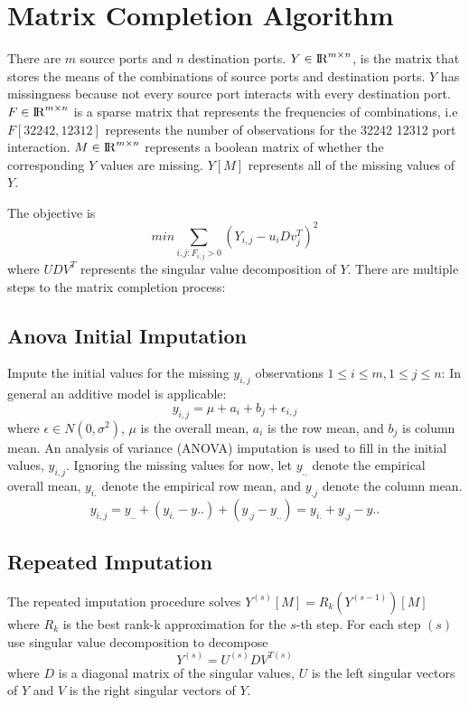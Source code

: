 \documentclass[12pt,twoside]{dukestatscithesis}
\theoremstyle{definition}
\theoremstyle{definition}
\theoremstyle{definition}
\theoremstyle{remark}
\begin{document}
\section{Matrix Completion Algorithm}\label{matrix-completion-algorithm}

There are \(m\) source ports and \(n\) destination ports.
\(Y \in {\rm I\!R}^{m \times n}\), is the matrix that stores the means
of the combinations of source ports and destination ports. \(Y\) has
missingness because not every source port interacts with every
destination port. \(F \in {\rm I\!R}^{m \times n}\) is a sparse matrix
that represents the frequencies of combinations, i.e \(F[32242,12312]\)
represents the number of observations for the 32242 12312 port
interaction. \(M \in {\rm I\!R}^{m \times n}\) represents a boolean
matrix of whether the corresponding \(Y\) values are missing. \(Y[M]\)
represents all of the missing values of \(Y\).

The objective is \[min \sum_{i,j:F_{i,j} > 0} (Y_{i,j} - u_iDv^T_j)^2\]
where \(UDV^T\) represents the singular value decomposition of \(Y\).
There are multiple steps to the matrix completion process:

\subsection{Anova Initial Imputation}\label{anova-initial-imputation}

Impute the initial values for the missing \(y_{i,j}\) observations
\(1 \leq i \leq m, 1 \leq j \leq n\): In general an additive model is
applicable: \[y_{i,j} = \mu + a_i + b_j + \epsilon_{i,j}\] where
\(\epsilon \in N(0,\sigma^2)\), \(\mu\) is the overall mean, \(a_i\) is
the row mean, and \(b_j\) is column mean. An analysis of variance
(ANOVA) imputation is used to fill in the initial values, \(y_{i,j}\).
Ignoring the missing values for now, let \(y_{..}\) denote the empirical
overall mean, \(y_{i.}\) denote the empirical row mean, and \(y_{.j}\)
denote the column mean.
\[y_{i,j} = y_{..} + (y_{i.}-y{..}) + (y_{.j}-y_{..}) = y_{i.} + y_{.j} - y{..}\]

\subsection{Repeated Imputation}\label{repeated-imputation}

The repeated imputation procedure solves
\(Y^{(s)}[M] = R_k(Y^{(s-1)})[M]\) where \(R_k\) is the best rank-k
approximation for the \(s\)-th step. For each step \((s)\) use singular
value decomposition to decompose \[Y^{(s)} =  U^{(s)}DV^{T(s)}\] where
\(D\) is a diagonal matrix of the singular values, \(U\) is the left
singular vectors of \(Y\) and \(V\) is the right singular vectors of
\(Y\).
\end{document}
